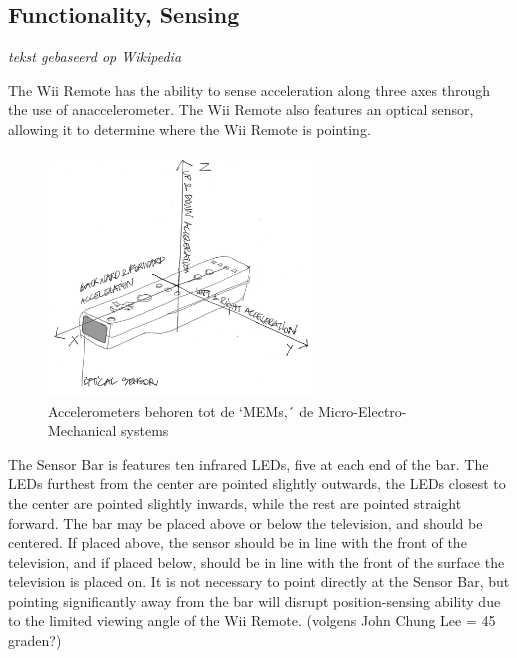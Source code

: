 \documentclass[11pt]{article}
\begin{document}
\subsection{Functionality, Sensing}

%

\begin{flushright}\textit{tekst gebaseerd op Wikipedia} \end{flushright} 
The Wii Remote has the ability to sense acceleration along three axes through the use of anaccelerometer. The Wii Remote also features an optical sensor, allowing it to determine where the Wii Remote is pointing. 

\begin{figure}[h]
\begin{center}
\includegraphics[width=7cm]{wiiControllerSchets.jpg}
\caption{Accelerometers behoren tot de `MEMs,´ de Micro-Electro-Mechanical systems}
\end{center}
\end{figure}

\newpage

The Sensor Bar is features ten infrared LEDs, five at each end of the bar. The LEDs furthest from the center are pointed slightly outwards, the LEDs closest to the center are pointed slightly inwards, while the rest are pointed straight forward. The bar may be placed above or below the television, and should be centered. If placed above, the sensor should be in line with the front of the television, and if placed below, should be in line with the front of the surface the television is placed on. It is not necessary to point directly at the Sensor Bar, but pointing significantly away from the bar will disrupt position-sensing ability due to the limited viewing angle of the Wii Remote. (volgens John Chung Lee = 45 graden?)\\
\end{document}
